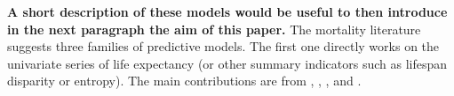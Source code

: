 \documentclass[a4,11pt]{article}
\begin{document}


\textbf{A short description of these models would be useful to then introduce in the next paragraph the aim of this paper.} The mortality literature suggests three families of predictive models. The first one directly works on the univariate series of life expectancy (or other summary indicators such as lifespan disparity or entropy). The main contributions are from \cite{Lee2006}, \cite{TorriVaupel12}, \cite{Raftery13}, \cite{Pascariu18} and \cite{Nigri19}. \linebreak
\end{document}
